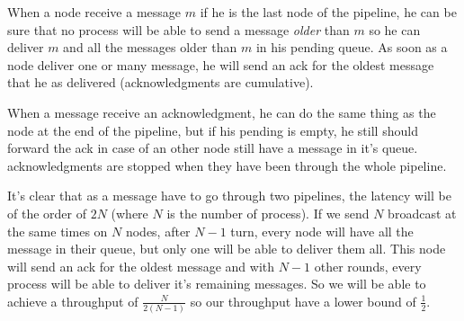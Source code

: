 \documentclass[a4paper]{article}
\begin{document}
When a node receive a message $m$ if he is the last node of the pipeline, he can
be sure that no process will be able to send a message \textit{older} than $m$ so
he can deliver $m$ and all the messages older than $m$ in his pending queue. As
soon as a node deliver one or many message, he will send an ack for the oldest
message that he as delivered (acknowledgments are cumulative).

When a message receive an acknowledgment, he can do the same thing as the node at
the end of the pipeline, but if his pending is empty, he still should forward
the ack in case of an other node still have a message in it's queue.
acknowledgments are stopped when they have been through the whole pipeline.

It's clear that as a message have to go through two pipelines, the latency will
be of the order of $2N$ (where $N$ is the number of process). If we send $N$
broadcast at the same times on $N$ nodes, after $N-1$ turn, every node will have
all the message in their queue, but only one will be able to deliver them all.
This node will send an ack for the oldest message and with $N-1$ other rounds,
every process will be able to deliver it's remaining messages. So we will be
able to achieve a throughput of $\frac{N}{2(N-1)}$ so our throughput have a
lower bound of $\frac{1}{2}$.
\end{document}
